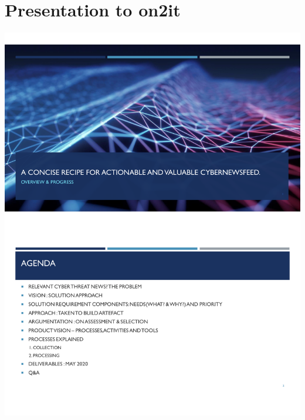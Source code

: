 \section{Presentation to on2it}\label{Presentation to on2it}
\includegraphics[page=1,scale=0.75]{Appendices/Threat-Brief-Product-Jeroen-jean.pdf} 
